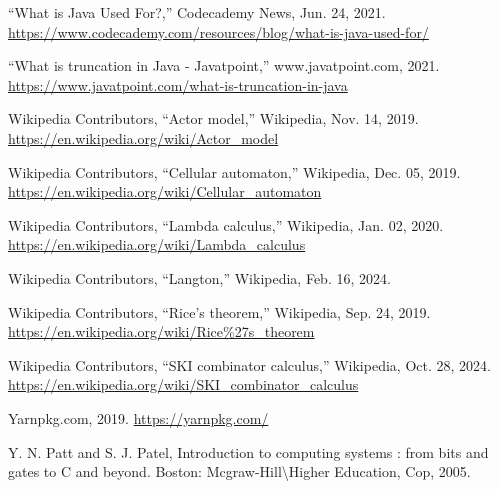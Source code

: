 \documentclass[12pt]{report} %
\begin{document}
\begin{singlespace}
\begin{thebibliography}{}
             “What is Java Used For?,” Codecademy News, Jun. 24, 2021. \href{https://www.codecademy.com/resources/blog/what-is-java-used-for/}{https://www.codecademy.com/resources/blog/what-is-java-used-for/}
            
             “What is truncation in Java - Javatpoint,” www.javatpoint.com, 2021. \href{https://www.javatpoint.com/what-is-truncation-in-java}{https://www.javatpoint.com/what-is-truncation-in-java}
            
             Wikipedia Contributors, “Actor model,” Wikipedia, Nov. 14, 2019. \href{https://en.wikipedia.org/wiki/Actor_model}{https://en.wikipedia.org/wiki/Actor\_model}
            
             Wikipedia Contributors, “Cellular automaton,” Wikipedia, Dec. 05, 2019. \href{https://en.wikipedia.org/wiki/Cellular_automaton}{https://en.wikipedia.org/wiki/Cellular\_automaton}
            
             Wikipedia Contributors, “Lambda calculus,” Wikipedia, Jan. 02, 2020. \href{https://en.wikipedia.org/wiki/Lambda_calculus}{https://en.wikipedia.org/wiki/Lambda\_calculus}
            
             Wikipedia Contributors, “Langton,” Wikipedia, Feb. 16, 2024.
            
             Wikipedia Contributors, “Rice’s theorem,” Wikipedia, Sep. 24, 2019. \href{https://en.wikipedia.org/wiki/Rice%27s_theorem}{https://en.wikipedia.org/wiki/Rice\%27s\_theorem}
            
             Wikipedia Contributors, “SKI combinator calculus,” Wikipedia, Oct. 28, 2024. \href{https://en.wikipedia.org/wiki/SKI_combinator_calculus}{https://en.wikipedia.org/wiki/SKI\_combinator\_calculus}
            
             Yarnpkg.com, 2019. \href{https://yarnpkg.com/}{https://yarnpkg.com/}
            
             Y. N. Patt and S. J. Patel, Introduction to computing systems : from bits and gates to C and beyond. Boston: Mcgraw-Hill\textbackslash Higher Education, Cop, 2005.
            
        \end{thebibliography}

    \end{singlespace}

    \appendix
        
    
    
    

    

    
\end{document}

